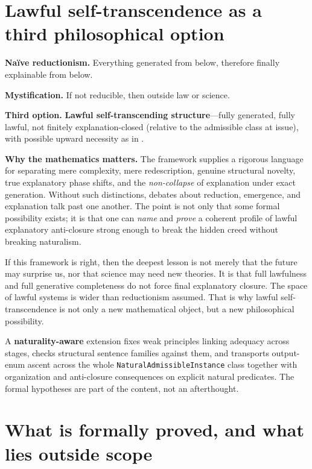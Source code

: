 \documentclass[11pt,a4paper]{article}
\newenvironment{keybox}[1]{%
  \Needspace*{8\baselineskip}%
  \begin{tcolorbox}[
    enhanced, breakable=false,
    colback=blue!5, colframe=blue!45!black, coltitle=black,
    colbacktitle=blue!14, boxrule=0.85pt, arc=2.5pt,
    left=9pt, right=9pt, top=6pt, bottom=6pt,
    titlerule=0.55pt, fonttitle=\bfseries, title={#1},
    before upper=\raggedright,
    before skip=0.9\baselineskip, after skip=0.9\baselineskip
  ]%
}{%
  \end{tcolorbox}%
}
\theoremstyle{definition}
\begin{document}
\section{Lawful self-transcendence as a third philosophical option}\label{sec:philosophical}

\begin{keybox}{Three stances (interpretive)}
\textbf{Naïve reductionism.} Everything generated from below, therefore finally explainable from below.

\medskip
\textbf{Mystification.} If not reducible, then outside law or science.

\medskip
\textbf{Third option.} \textbf{Lawful self-transcending structure}---fully generated, fully lawful, not finitely explanation-closed (relative to the admissible class at issue), with possible upward necessity as in .
\end{keybox}

\medskip
\noindent
\textbf{Why the mathematics matters.}
The framework supplies a rigorous language for separating mere complexity, mere redescription, genuine structural novelty, true explanatory phase shifts, and the \emph{non-collapse} of explanation under exact generation. Without such distinctions, debates about reduction, emergence, and explanation talk past one another. The point is not only that some formal possibility exists; it is that one can \emph{name} and \emph{prove} a coherent profile of lawful explanatory anti-closure strong enough to break the hidden creed without breaking naturalism.

If this framework is right, then the deepest lesson is not merely that the future may surprise us, nor that science may need new theories. It is that full lawfulness and full generative completeness do not force final explanatory closure. The space of lawful systems is wider than reductionism assumed. That is why lawful self-transcendence is not only a new mathematical object, but a new philosophical possibility.

\medskip
\noindent
A \textbf{naturality-aware} extension fixes weak principles linking adequacy across stages, checks structural sentence families against them, and transports output-enum ascent across the whole \texttt{NaturalAdmissibleInstance} class together with organization and anti-closure consequences on explicit natural predicates. The formal hypotheses are part of the content, not an afterthought.

\section{What is formally proved, and what lies outside scope}\label{sec:boundaries}
\end{document}

